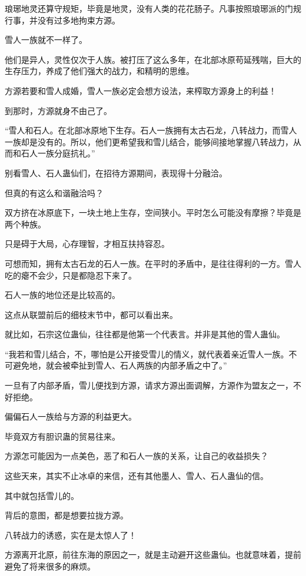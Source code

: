 \begin{this_body}
琅琊地灵还算守规矩，毕竟是地灵，没有人类的花花肠子。凡事按照琅琊派的门规行事，并没有过多地拘束方源。

雪人一族就不一样了。

他们是异人，灵性仅次于人族。被打压了这么多年，在北部冰原苟延残喘，巨大的生存压力，养成了他们强大的战力，和精明的思维。

方源若要和雪人成婚，雪人一族必定会想方设法，来榨取方源身上的利益！

到那时，方源就身不由己了。

“雪人和石人。在北部冰原地下生存。石人一族拥有太古石龙，八转战力，而雪人一族却是没有的。所以，他们更希望我和雪儿结合，能够间接地掌握八转战力，从而和石人一族分庭抗礼。”

别看雪人、石人蛊仙们，在招待方源期间，表现得十分融洽。

但真的有这么和谐融洽吗？

双方挤在冰原底下，一块土地上生存，空间狭小。平时怎么可能没有摩擦？毕竟是两个种族。

只是碍于大局，心存理智，才相互扶持容忍。

可想而知，拥有太古石龙的石人一族。在平时的矛盾中，是往往得利的一方。雪人吃的瘪不会少，只是都隐忍下来了。

石人一族的地位还是比较高的。

这点从联盟前后的细枝末节中，都可以看出来。

就比如，石宗这位蛊仙，往往都是他第一个代表言。并非是其他的雪人蛊仙。

“我若和雪儿结合，不，哪怕是公开接受雪儿的情义，就代表着亲近雪人一族。不可避免地，就会被牵扯到雪人、石人两族的内部矛盾之中了。”

一旦有了内部矛盾，雪儿便找到方源，请求方源出面调解，方源作为盟友之一，不好拒绝。

偏偏石人一族给与方源的利益更大。

毕竟双方有胆识蛊的贸易往来。

方源怎可能因为一点美色，恶了和石人一族的关系，让自己的收益损失？

这些天来，其实不止冰卓的来信，还有其他墨人、雪人、石人蛊仙的信。

其中就包括雪儿的。

背后的意图，都是想要拉拢方源。

八转战力的诱惑，实在是太惊人了！

方源离开北原，前往东海的原因之一，就是主动避开这些蛊仙。也就意味着，提前避免了将来很多的麻烦。


\end{this_body}
